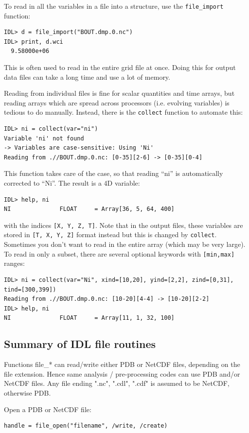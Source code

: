 \documentclass[12pt]{article}
\newcommand{\code}[1]{\texttt{#1}}
\begin{document}
To read in all the variables in a file into a structure, use the \code{file\_import} function:
\begin{verbatim}
IDL> d = file_import("BOUT.dmp.0.nc")
IDL> print, d.wci
  9.58000e+06
\end{verbatim}
This is often used to read in the entire grid file at once. Doing this for
output data files can take a long time and use a lot of memory.

Reading from individual files is fine for scalar quantities and time arrays, but reading arrays
which are spread across processors (i.e. evolving variables) is tedious
to do manually. Instead, there is the \code{collect} function to automate this:
\begin{verbatim}
IDL> ni = collect(var="ni")
Variable 'ni' not found
-> Variables are case-sensitive: Using 'Ni'
Reading from .//BOUT.dmp.0.nc: [0-35][2-6] -> [0-35][0-4]
\end{verbatim}
This function takes care of the case, so that reading ``ni'' is automatically corrected to ``Ni''. The result is a 4D variable:
\begin{verbatim}
IDL> help, ni
NI              FLOAT     = Array[36, 5, 64, 400]
\end{verbatim}
with the indices \code{[X, Y, Z, T]}. Note that in the output files,
these variables are stored in \code{[T, X, Y, Z]} format instead but
this is changed by \code{collect}.
Sometimes you don't want to read in the entire array (which may be very large). To read in only a subset, there are several optional keywords with \code{[min,max]}
ranges:
\begin{verbatim}
IDL> ni = collect(var="Ni", xind=[10,20], yind=[2,2], zind=[0,31], tind=[300,399])
Reading from .//BOUT.dmp.0.nc: [10-20][4-4] -> [10-20][2-2]
IDL> help, ni
NI              FLOAT     = Array[11, 1, 32, 100]
\end{verbatim}

\subsection{Summary of IDL file routines}

Functions file\_* can read/write either PDB or NetCDF
files, depending on the file extension. Hence same
analysis / pre-processing codes can use PDB and/or
NetCDF files. Any file ending ".nc", ".cdl", ".cdf"
is assumed to be NetCDF, otherwise PDB.

Open a PDB or NetCDF file:
\begin{verbatim}
handle = file_open("filename", /write, /create)
\end{verbatim}
\end{document}
